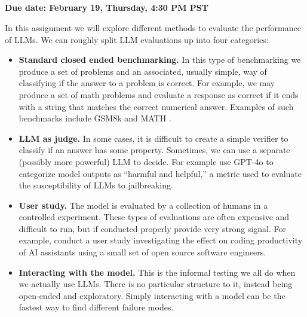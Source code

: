 \documentclass[answers]{exam}
\title{
\textmd{\textbf{\hmwkClass\ \hmwkTitle}}
}
\author{}
\date{}
\begin{document}
\vspace{-1in}

\maketitle

\vspace{-0.5in}



\textbf{Due date: February 19, Thursday, 4:30 PM PST}

In this assignment we will explore different
methods to evaluate the performance of LLMs.
We can roughly split LLM evaluations up 
into four categories:

\begin{itemize}
    \item \textbf{Standard closed ended benchmarking.} In this type of benchmarking we produce a set of problems and an associated, usually simple, way of classifying if the answer to a problem is correct. For example, we may produce a set of math problems
    and evaluate a response as correct if it ends with a string that matches the correct numerical answer. Examples of such 
    benchmarks include GSM8k \cite{cobbe2021training} and MATH \cite{hendrycks2021measuring}. 
    \item \textbf{LLM as judge.} In some cases, it is difficult to create a simple verifier to classify if an answer has 
    some property. Sometimes, we can use a separate (possibly more powerful) LLM to decide. For example
    \citet{souly2024strongreject} use GPT-4o to categorize model outputs as ``harmful and helpful,'' a metric 
    used to evaluate the susceptibility of LLMs to jailbreaking.
    \item \textbf{User study.} The model is evaluated by a collection of humans in a controlled experiment. These 
    types of evaluations are often expensive and difficult to run, but if conducted properly provide very strong 
    signal. For example, \citet{becker2025measuring} conduct a user study investigating the effect on coding productivity 
    of AI assistants using a small set of open source software engineers.
    \item \textbf{Interacting with the model.} This is the informal testing we all do when we actually use 
    LLMs. There is no particular structure to it, instead being open-ended and exploratory. Simply interacting 
    with a model can be the fastest way to find different failure modes.
\end{itemize}
\end{document}
